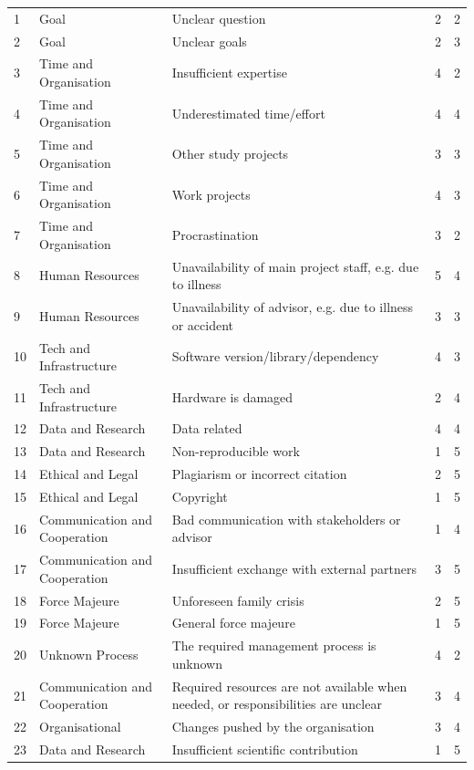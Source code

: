 \begin{longtable}{@{} C{1.1cm} L{3.2cm} L{8.1cm} C{1.6cm} C{1.6cm} @{}}
1 & Goal & Unclear question & 2 & 2 \\
2 & Goal & Unclear goals & 2 & 3 \\
3 & Time and Organisation & Insufficient expertise & 4 & 2 \\
4 & Time and Organisation & Underestimated time/effort & 4 & 4 \\
5 & Time and Organisation & Other study projects & 3 & 3 \\
6 & Time and Organisation & Work projects & 4 & 3 \\
7 & Time and Organisation & Procrastination & 3 & 2 \\
8 & Human Resources & Unavailability of main project staff, e.g. due to illness & 5 & 4 \\
9 & Human Resources & Unavailability of advisor, e.g. due to illness or accident & 3 & 3 \\
10 & Tech and Infrastructure & Software version/library/dependency & 4 & 3 \\
11 & Tech and Infrastructure & Hardware is damaged & 2 & 4 \\
12 & Data and Research & Data related & 4 & 4 \\
13 & Data and Research & Non-reproducible work & 1 & 5 \\
14 & Ethical and Legal & Plagiarism or incorrect citation & 2 & 5 \\
15 & Ethical and Legal & Copyright & 1 & 5 \\
16 & Communication and Cooperation & Bad communication with stakeholders or advisor & 1 & 4 \\
17 & Communication and Cooperation & Insufficient exchange with external partners & 3 & 5 \\
18 & Force Majeure & Unforeseen family crisis & 2 & 5 \\
19 & Force Majeure & General force majeure & 1 & 5 \\
20 & Unknown Process & The required management process is unknown & 4 & 2 \\
21 & Communication and Cooperation & Required resources are not available when needed, or responsibilities are unclear & 3 & 4 \\
22 & Organisational & Changes pushed by the organisation & 3 & 4 \\
23 & Data and Research & Insufficient scientific contribution & 1 & 5 \\

\end{longtable}


